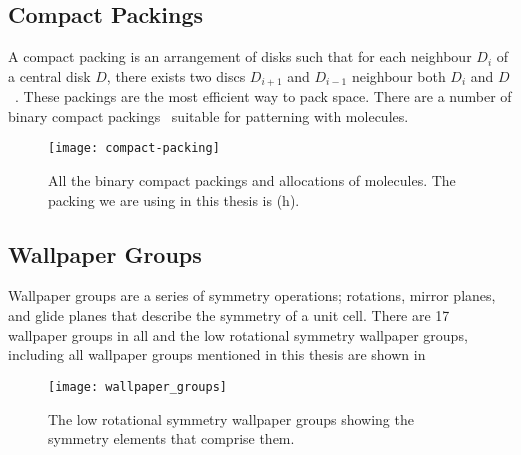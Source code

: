 \begin{appendices}


\chapter{}

\section{Compact Packings}
\label{sec:compact}

A compact packing is an arrangement of disks such that for each neighbour $D_i$ of a central disk $D$, there exists two discs $D_{i+1}$ and $D_{i-1}$ neighbour both $D_i$ and $D$~\cite{heppes:03,kennedy:06}. These packings are the most efficient way to pack space. There are a number of binary compact packings~ suitable for patterning with molecules.
\begin{figure}[htb]
    \texttt{[image: compact-packing]}
    \caption{All the binary compact packings and allocations of molecules. The packing we are using in this thesis is (h).}
    \label{fig:compact packing}
\end{figure}

\vspace{-3em}
\section{Wallpaper Groups}
\label{sec:wallpaper}

Wallpaper groups are a series of symmetry operations; rotations, mirror planes, and glide planes that describe the symmetry of a unit cell. There are 17 wallpaper groups in all and the low rotational symmetry wallpaper groups, including all wallpaper groups mentioned in this thesis are shown in 
\begin{figure}[hbt]
    \centering
    \texttt{[image: wallpaper\_groups]}
    \caption{The low rotational symmetry wallpaper groups showing the symmetry elements that comprise them.}
    \label{fig:wallpaper}
\end{figure}
\end{appendices}
